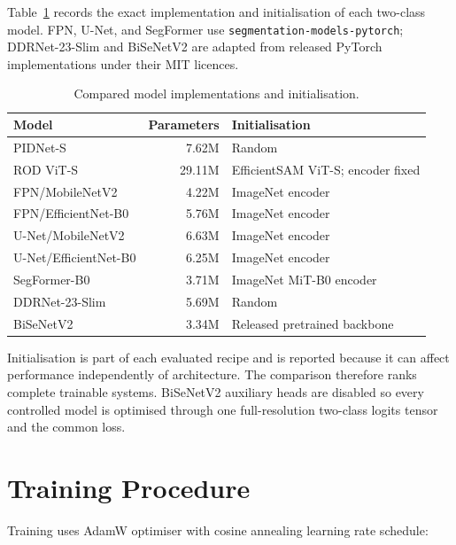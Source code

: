 \documentclass[12pt,a4paper]{report}
\begin{document}
Table~\ref{tab:model_implementations} records the exact implementation and
initialisation of each two-class model. FPN, U-Net, and SegFormer use
\texttt{segmentation-models-pytorch}; DDRNet-23-Slim and BiSeNetV2 are adapted
from released PyTorch implementations under their MIT licences.

\begin{table}[H]
\centering
\caption{Compared model implementations and initialisation.}
\label{tab:model_implementations}
\small
\begin{tabular}{@{}lrl@{}}
\toprule
\textbf{Model} & \textbf{Parameters} & \textbf{Initialisation} \\
\midrule
PIDNet-S                    & 7.62M  & Random \\
ROD ViT-S                   & 29.11M & EfficientSAM ViT-S; encoder fixed \\
FPN/MobileNetV2             & 4.22M  & ImageNet encoder \\
FPN/EfficientNet-B0         & 5.76M  & ImageNet encoder \\
U-Net/MobileNetV2           & 6.63M  & ImageNet encoder \\
U-Net/EfficientNet-B0       & 6.25M  & ImageNet encoder \\
SegFormer-B0                & 3.71M  & ImageNet MiT-B0 encoder \\
DDRNet-23-Slim              & 5.69M  & Random \\
BiSeNetV2                   & 3.34M  & Released pretrained backbone \\
\bottomrule
\end{tabular}
\end{table}

Initialisation is part of each evaluated recipe and is reported because it can
affect performance independently of architecture. The comparison therefore
ranks complete trainable systems. BiSeNetV2 auxiliary heads are disabled so
every controlled model is optimised through one full-resolution two-class
logits tensor and the common loss.

\section{Training Procedure}

Training uses AdamW optimiser with cosine annealing learning rate schedule:
\end{document}
